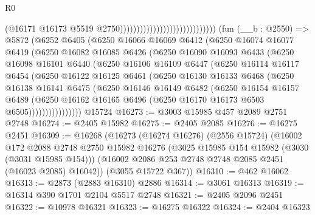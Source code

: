 \begin{lexlean}{R0}
\begin{coremodule}
                                                            (@16171
                                                              @16173
                                                              @5519
                                                              @2750)))))))))))))))))))))))))))))
    (fun (__b : @2550) =>
    @5872
      (@6252
        @6405
        (@6250
          @16066
          @16069
          @6412
          (@6250
            @16074
            @16077
            @6419
            (@6250
              @16082
              @16085
              @6426
              (@6250
                @16090
                @16093
                @6433
                (@6250
                  @16098
                  @16101
                  @6440
                  (@6250
                    @16106
                    @16109
                    @6447
                    (@6250
                      @16114
                      @16117
                      @6454
                      (@6250
                        @16122
                        @16125
                        @6461
                        (@6250
                          @16130
                          @16133
                          @6468
                          (@6250
                            @16138
                            @16141
                            @6475
                            (@6250
                              @16146
                              @16149
                              @6482
                              (@6250
                                @16154
                                @16157
                                @6489
                                (@6250
                                  @16162
                                  @16165
                                  @6496
                                  (@6250 @16170 @16173 @6503 @6505))))))))))))))))
    @15724
@16273 := @3003 @15985 @457 @2089 @2751 @2748
@16274 := @2405 @15982
@16275 := @2405 @2085
@16276 := @16275 @2451
@16309 := @16268
    (@16273
      (@16274 @16276)
      (@2556 @15724)
      (@16002
        @172
        @2088
        @2748
        @2750
        @15982
        @16276
        (@3025 @15985 @154 @15982 (@3030 (@3031 @15985 @154)))
        (@16002 @2086 @253 @2748 @2748 @2085 @2451 (@16023 @2085) @16042))
      (@3055 @15722 @367))
@16310 := @462 @16062
@16313 := @2873 (@2883 @16310) @2886
@16314 := @3061 @16313
@16319 := @16314 @390 @1701 @2104 @5517 @2748
@16321 := @2405 @2096 @2451
@16322 := @10978 @16321
@16323 := @16275 @16322
@16324 := @2404 @16323

\end{coremodule}
\end{lexlean}
